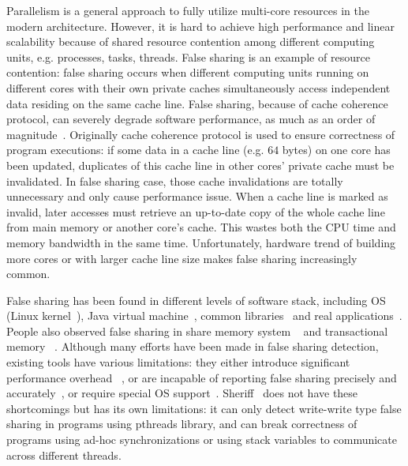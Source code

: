 
\label{sec:intro} 

Parallelism is a general approach to fully utilize multi-core resources in the modern architecture. 
However, it is hard to achieve high performance and linear scalability because of shared 
resource contention among different computing units, e.g. processes, tasks, threads.
False sharing is an example of resource contention: false sharing occurs when 
different computing units running on different cores with their own private caches 
simultaneously access independent data residing on the same cache line.
False sharing, because of cache coherence protocol, can severely degrade software 
performance, as much as an order of magnitude~\cite{falseshareeffect}.
Originally cache coherence protocol is used to ensure correctness of program executions: 
if some data in a cache line (e.g. $64$ bytes) on one core has been updated, 
duplicates of this cache line in other cores' private 
cache must be invalidated. 
In false sharing case, those cache invalidations are totally unnecessary and only
cause performance issue. 
When a cache line is marked as invalid, 
later accesses must retrieve an up-to-date copy of the whole cache line 
from main memory or another core's cache.
This wastes both the CPU time and memory bandwidth in the same time. 
Unfortunately, hardware trend of building more cores
or with larger cache line size makes false sharing increasingly common.

False sharing has been found in different levels of software stack, including
OS (Linux kernel~\cite{OSfalsesharing}), Java virtual machine~\cite{JVMfalsesharing}, 
common libraries~\cite{libfalsesharing} and real applications~\cite{appfalsesharing, mysql}. 
People also observed false sharing in share memory system
~\cite{dsmfalsesharing} and transactional memory ~\cite{tmfalsesharing}.
Although many efforts have been made in false sharing detection, existing
tools have various limitations:
they either introduce significant performance overhead~
\cite{falseshare:simulator, falseshare:binaryinstrumentation1,falseshare:binaryinstrumentation2}, or 
are incapable of reporting false sharing 
precisely and accurately~\cite{qinzhaodetection, detect:ptu, detect:intel, falseshare:binaryinstrumentation1, DProf, falseshare:binaryinstrumentation2}, 
or require special OS support~\cite{OSdetection}.
Sheriff~\cite{sheriff} does not have these shortcomings but has its own limitations: 
it can only detect write-write type false sharing in programs using pthreads library,
and can break correctness of programs using ad-hoc synchronizations or using stack variables to 
communicate across different threads. 

